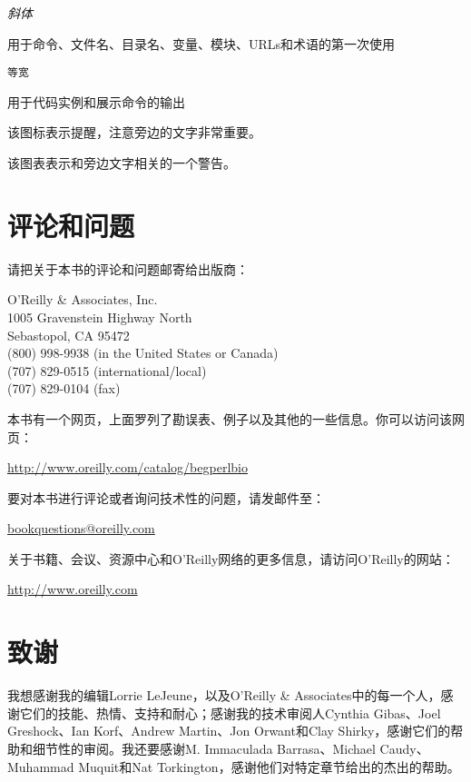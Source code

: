 \textit{斜体}
\begin{adjustwidth}{1cm}{0cm}
用于命令、文件名、目录名、变量、模块、URLs和术语的第一次使用
\end{adjustwidth}

\texttt{等宽}
\begin{adjustwidth}{1cm}{0cm}
用于代码实例和展示命令的输出
\end{adjustwidth}

\begin{adjustwidth}{2cm}{2cm}
\noindent
该图标表示提醒，注意旁边的文字非常重要。
\end{adjustwidth}

\begin{adjustwidth}{2cm}{2cm}
\noindent
该图表表示和旁边文字相关的一个警告。
\end{adjustwidth}

\section*{评论和问题}
请把关于本书的评论和问题邮寄给出版商：

O'Reilly \& Associates, Inc.\\
1005 Gravenstein Highway North\\
Sebastopol, CA 95472\\
(800) 998-9938 (in the United States or Canada)\\
(707) 829-0515 (international/local)\\
(707) 829-0104 (fax)

本书有一个网页，上面罗列了勘误表、例子以及其他的一些信息。你可以访问该网页：

\href{http://www.oreilly.com/catalog/begperlbio}{http://www.oreilly.com/catalog/begperlbio}

要对本书进行评论或者询问技术性的问题，请发邮件至：

\href{bookquestions@oreilly.com}{bookquestions@oreilly.com}

关于书籍、会议、资源中心和O'Reilly网络的更多信息，请访问O'Reilly的网站：

\href{http://www.oreilly.com}{http://www.oreilly.com}

\section*{致谢}
我想感谢我的编辑Lorrie LeJeune，以及O'Reilly \& Associates中的每一个人，感谢它们的技能、热情、支持和耐心；感谢我的技术审阅人Cynthia Gibas、Joel Greshock、Ian Korf、Andrew Martin、Jon Orwant和Clay Shirky，感谢它们的帮助和细节性的审阅。我还要感谢M. Immaculada Barrasa、Michael Caudy、Muhammad Muquit和Nat Torkington，感谢他们对特定章节给出的杰出的帮助。

